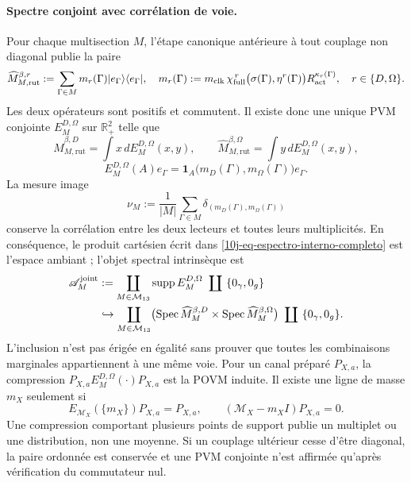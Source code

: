 \paragraph{Spectre conjoint avec corrélation de voie.}
Pour chaque multisection \(M\), l'étape canonique antérieure à tout couplage non diagonal publie la paire
\begin{equation}
 \widehat M_{M,\mathrm{rut}}^{\beta,r}
 :=\sum_{\Gamma\in M}m_r(\Gamma)
 |e_\Gamma\rangle\langle e_\Gamma|,
 \quad
 m_r(\Gamma):=m_{\rm clk}\,
 \chi_{\rm full}^{\,r}\bigl(\sigma(\Gamma),\eta^r(\Gamma)\bigr)
 R_{\rm act}^{\kappa_r(\Gamma)},
 \quad r\in\{D,\Omega\}.
 \label{10j-eq-par-diagonal-ruta}
\end{equation}
Les deux opérateurs sont positifs et commutent. Il existe donc une unique PVM conjointe \(E_M^{D,\Omega}\) sur \(\mathbb R_+^2\) telle que
\begin{equation}
 \widehat M_{M,\mathrm{rut}}^{\beta,D}=\int x\,dE_M^{D,\Omega}(x,y),
 \qquad
 \widehat M_{M,\mathrm{rut}}^{\beta,\Omega}=\int y\,dE_M^{D,\Omega}(x,y),
 \label{10j-eq-pvm-conjunta}
\end{equation}
\begin{equation}
 E_M^{D,\Omega}(A)e_\Gamma
 =\mathbf 1_A\!\bigl(m_D(\Gamma),m_\Omega(\Gamma)\bigr)e_\Gamma.
 \label{10j-eq-pvm-accion-ruta}
\end{equation}
La mesure image
\begin{equation}
 \nu_M:=\frac1{|M|}\sum_{\Gamma\in M}
 \delta_{(m_D(\Gamma),m_\Omega(\Gamma))}
 \label{10j-eq-medida-imagen-conjunta}
\end{equation}
conserve la corrélation entre les deux lecteurs et toutes leurs multiplicités. En conséquence, le produit cartésien écrit dans \eqref{10j-eq-espectro-interno-completo} est l'espace ambiant ; l'objet spectral intrinsèque est
\begin{equation}
 \begin{aligned}
 \mathscr A_M^{\rm joint}
 &:=
 \coprod_{M\in\mathcal M_{13}}\operatorname{supp}E_M^{D,\Omega}
 \ \coprod\ \{0_\gamma,0_g\}\\
 &\hookrightarrow
 \coprod_{M\in\mathcal M_{13}}
 \bigl(\operatorname{Spec}\widehat M_M^{\beta,D}
 \times\operatorname{Spec}\widehat M_M^{\beta,\Omega}\bigr)
 \ \coprod\ \{0_\gamma,0_g\}.
 \end{aligned}
 \label{10j-eq-espectro-conjunto-completo}
\end{equation}
L'inclusion n'est pas érigée en égalité sans prouver que toutes les combinaisons marginales appartiennent à une même voie. Pour un canal préparé \(P_{X,a}\), la compression \(P_{X,a}E_M^{D,\Omega}(\cdot)P_{X,a}\) est la POVM induite. Il existe une ligne de masse \(m_X\) seulement si
\begin{equation}
 E_{\mathcal M_X}(\{m_X\})P_{X,a}=P_{X,a},
 \qquad
 (\mathcal M_X-m_XI)P_{X,a}=0.
 \label{10j-eq-criterio-linea-espectral}
\end{equation}
Une compression comportant plusieurs points de support publie un multiplet ou une distribution, non une moyenne. Si un couplage ultérieur cesse d'être diagonal, la paire ordonnée est conservée et une PVM conjointe n'est affirmée qu'après vérification du commutateur nul.

